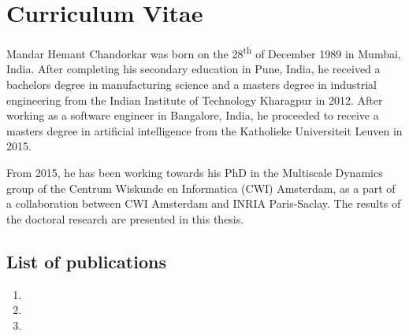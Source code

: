 \chapter*{Curriculum Vitae}\label{chapter:cv}
\thispagestyle{empty}


Mandar Hemant Chandorkar was born on the 28\textsuperscript{th} of December 1989 in Mumbai, India.
After completing his secondary education in Pune, India, he received a bachelors degree in 
manufacturing science and a masters degree in industrial engineering from the 
Indian Institute of Technology Kharagpur in 2012. After working as a software engineer in 
Bangalore, India, he proceeded to receive a masters degree in artificial intelligence from the 
Katholieke Universiteit Leuven in 2015. 

From 2015, he has been working towards his PhD in the Multiscale Dynamics group of the 
Centrum Wiskunde en Informatica (CWI) Amsterdam, as a part of a collaboration between CWI Amsterdam 
and INRIA Paris-Saclay. The results of the doctoral research are presented in this thesis.   

\section*{List of publications}

\begin{enumerate}
    \item {}
    \item {}
    \item {}
\end{enumerate}



